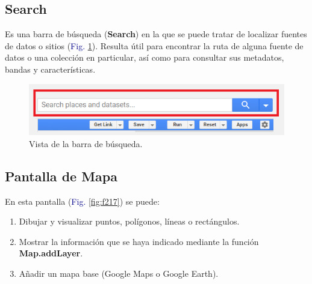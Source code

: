 \documentclass[
  12pt,
  letterpaper,
  twoside]{book}
\providecommand{\tightlist}{%
  \setlength{\itemsep}{0pt}\setlength{\parskip}{0pt}}
\newcommand\boldpurple[1]{\textcolor{darkpurple}{\textbf{#1}}}
\begin{document}
\hypertarget{search}{%
\subsection*{Search}\label{search}}

Es una barra de búsqueda (\textbf{Search}) en la que se puede tratar de localizar fuentes de datos o sitios (\textcolor{darkblue}{Fig.} \ref{fig:f216}). Resulta útil para encontrar la ruta de alguna fuente de datos o una colección en particular, así como para consultar sus metadatos, bandas y características.

\begin{figure}[H]

{\centering \includegraphics[width=0.8\linewidth]{Img/search} 

}

\caption{Vista de la barra de búsqueda.}\label{fig:f216}
\end{figure}

\hypertarget{pantalla-de-mapa}{%
\subsection*{Pantalla de Mapa}\label{pantalla-de-mapa}}

En esta pantalla (\textcolor{darkblue}{Fig.} \ref{fig:f217}) se puede:

\begin{enumerate}
\def\labelenumi{\arabic{enumi}.}
\tightlist
\item
  Dibujar y visualizar puntos, polígonos, líneas o rectángulos.
\item
  Mostrar la información que se haya indicado mediante la función \boldpurple{Map.addLayer}.
\item
  Añadir un mapa base (Google Maps o Google Earth).
\end{enumerate}
\end{document}
